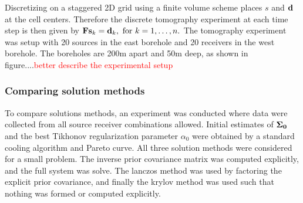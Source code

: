 \documentclass[12pt]{article}
\newcommand {\bfd}   { {\bf d} }
\newcommand {\bfs}   { {\bf s} }
\newcommand{\alert}[1] {\textcolor{red}{#1}}
\newcommand{\bF}  { {\bf F} }      %
\newcommand{\Sigh}{\bf \Sigma}
\begin{document}
Discretizing on a staggered 2D grid using a finite volume scheme 
places $s$ and ${\bf d}$ at the cell centers. Therefore the discrete tomography experiment at each time step is then given by 
$
 	\bF{\bfs_k} = \bfd_k, \text{ for } k=1,\ldots,n.
$
The tomography experiment was setup with 20 sources in the east borehole and 20 receivers in the west borehole. The boreholes are 200m apart and 50m deep, as shown in figure....\alert{better describe the experimental setup}
 
 
\subsubsection{Comparing solution methods} %
To compare solutions methods, an experiment was conducted where data were collected from all source receiver combinations allowed. Initial estimates of $\Sigh_0$ and the best Tikhonov regularization parameter $\alpha_0$ were obtained by a standard cooling algorithm and Pareto curve. All three solution methods were considered for a small problem. The inverse prior covariance matrix was computed explicitly, and the full system was solve. The lanczos method was used by factoring the explicit prior covariance, and finally the krylov method was used such that nothing was formed or computed explicitly. 
\end{document}
